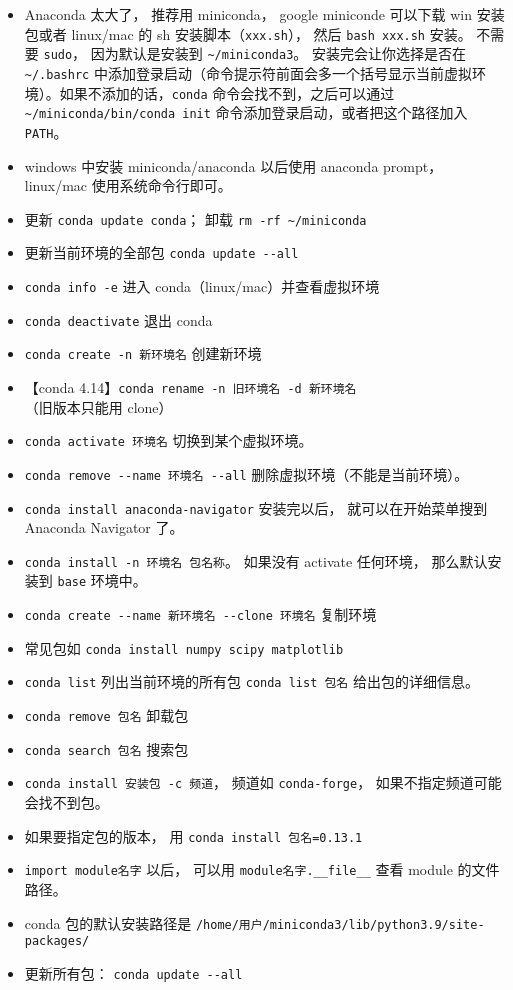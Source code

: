
\begin{itemize}
\item Anaconda 太大了， 推荐用 miniconda， google miniconde 可以下载 win 安装包或者 linux/mac 的 sh 安装脚本（\verb`xxx.sh`）， 然后 \verb`bash xxx.sh` 安装。 不需要 \verb`sudo`， 因为默认是安装到 \verb`~/miniconda3`。 安装完会让你选择是否在 \verb`~/.bashrc` 中添加登录启动（命令提示符前面会多一个括号显示当前虚拟环境）。如果不添加的话，\verb`conda` 命令会找不到，之后可以通过 \verb`~/miniconda/bin/conda init` 命令添加登录启动，或者把这个路径加入 \verb`PATH`。
\item windows 中安装 miniconda/anaconda 以后使用 anaconda prompt， linux/mac 使用系统命令行即可。
\item 更新 \verb`conda update conda`； 卸载 \verb`rm -rf ~/miniconda`
\item 更新当前环境的全部包 \verb`conda update --all`
\item \verb`conda info -e` 进入 conda（linux/mac）并查看虚拟环境
\item \verb`conda deactivate` 退出 conda
\item \verb`conda create -n 新环境名` 创建新环境
\item 【conda 4.14】\verb`conda rename -n 旧环境名 -d 新环境名` （旧版本只能用 clone）
\item \verb`conda activate 环境名` 切换到某个虚拟环境。
\item \verb`conda remove --name 环境名 --all` 删除虚拟环境（不能是当前环境）。
\item \verb`conda install anaconda-navigator` 安装完以后， 就可以在开始菜单搜到 Anaconda Navigator 了。
\item \verb`conda install -n 环境名 包名称`。 如果没有 activate 任何环境， 那么默认安装到 \verb`base` 环境中。
\item \verb`conda create --name 新环境名 --clone 环境名` 复制环境
\item 常见包如 \verb`conda install numpy scipy matplotlib`
\item \verb`conda list` 列出当前环境的所有包 \verb`conda list 包名` 给出包的详细信息。
\item \verb`conda remove 包名` 卸载包
\item \verb`conda search 包名` 搜索包
\item \verb`conda install 安装包 -c 频道`， 频道如 \verb`conda-forge`， 如果不指定频道可能会找不到包。
\item 如果要指定包的版本， 用 \verb`conda install 包名=0.13.1`
\item \verb`import module名字` 以后， 可以用 \verb`module名字.__file__` 查看 module 的文件路径。
\item conda 包的默认安装路径是 \verb`/home/用户/miniconda3/lib/python3.9/site-packages/`
\item 更新所有包： \verb`conda update --all`
\end{itemize}

